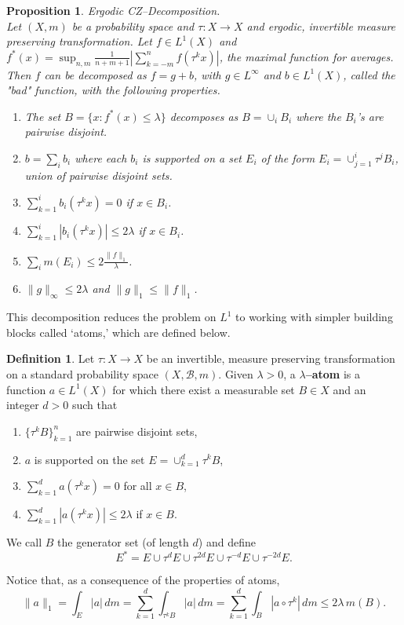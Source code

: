 \documentclass[11pt]{amsart}
\newtheorem{prop}[thm]{Proposition}
\theoremstyle{definition}
\newtheorem{defn}[thm]{Definition} %
\theoremstyle{remark}
\begin{document}
\begin{prop}\label{prop:Roger_CZ}  \cite{Roger} Ergodic CZ--Decomposition.\\ 
Let $(X, m)$ be a probability space and $\tau : X \to X$ and ergodic, invertible measure preserving transformation. 
Let $f\in L^1(X)$ and\\ $f^*(x)= \sup_{n,m} \frac 1{n+m+1} |\sum_{k=-m}^n f(\tau^kx)|$, the maximal function for averages. Then $f$ can be decomposed as $f=g+b$,  with $g\in L^{\infty}$ and $b\in L^1(X)$, called the "bad" function,  with the following properties. 
\begin{enumerate}
\item[a)]
The set $B=\{x:  f^*(x) \le \lambda\}$ decomposes as $B= \cup_i B_i$ where the $B_i$'s are pairwise disjoint.
\item[b)] $b=\sum_i b_i$ where each $b_i$ is supported on a set $E_i$ of the form $E_i=\cup_{j=1}^{i} \tau^jB_i$, union of pairwise disjoint sets.
\item[c)] $\sum_{k=1}^{i}b_i(\tau^kx)=0$ if $x\in B_i$.
\item[d)] $\sum_{k=1}^{i}|b_i(\tau^kx)| \le 2 \lambda$ if $x\in B_i$.
\item[e)] $\sum_i m(E_i) \le 2 \frac{\lVert f\rVert_1}{\lambda}$.
\item[f)] $\lVert g\rVert_{\infty} \le 2\lambda$ and $\lVert g\lVert_1\le \lVert f\rVert_1$. 
\end{enumerate}
\end{prop}

This decomposition reduces the problem on $L^1$ to working with simpler building blocks called ‘atoms,’ which are defined below.
\begin{defn} \label{def:atom} Let $\tau:X\to X$ be an invertible, measure preserving  transformation on a standard probability space $(X,\mathcal B,m)$. Given $\lambda>0$, 
a {\bf $\lambda$--atom} is a function $a\in L^1(X)$ for which there exist a measurable set $B\in X$ and an integer $d>0$ such that
\begin{enumerate}
\item  $\{\tau^k B\}_{k=1}^n$ are pairwise disjoint sets, 
\item $a$ is supported on the set $E=\cup_{k=1}^d \tau^k B$,
\item $\sum_{k=1}^d a(\tau^k x) =0$ for all $x\in B$,
\item $\sum_{k=1}^d |a(\tau^k x)|\le 2\lambda$ if $x\in B$.
\end{enumerate}
We call $B$ the generator set (of length $d$) and define  
\[E^*=E\cup \tau^{d}E \cup \tau^{2d}E  \cup \tau^{-d} E \cup \tau^{-2d} E.\]
\end{defn}
Notice that, as a consequence of the properties of atoms,
\begin{equation}\label{eq:def}
\|a\|_1 =  \int_E |a| \, dm =  \sum_{k=1}^d \int_{\tau^k B} |a| \, dm 
=  \sum_{k=1}^d \int_{B} |a\circ \tau^k| \, dm \le 2\lambda \, m(B).\end{equation}
\end{document}
